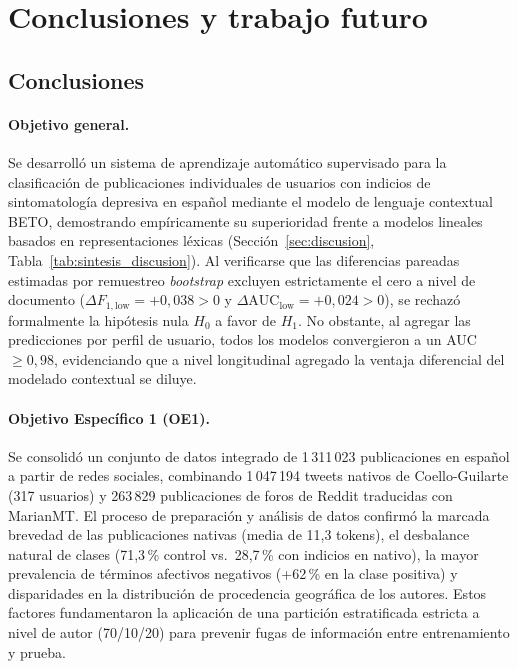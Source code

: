 \documentclass[12pt,a4paper]{article}
\begin{document}
\newpage
\section{Conclusiones y trabajo futuro}
\label{sec:conclusiones}

\subsection{Conclusiones}

\paragraph{Objetivo general.}
Se desarrolló un sistema de aprendizaje automático supervisado para la clasificación de publicaciones individuales de usuarios con indicios de sintomatología depresiva en español mediante el modelo de lenguaje contextual BETO, demostrando empíricamente su superioridad frente a modelos lineales basados en representaciones léxicas (Sección~\ref{sec:discusion}, Tabla~\ref{tab:sintesis_discusion}). Al verificarse que las diferencias pareadas estimadas por remuestreo \emph{bootstrap} excluyen estrictamente el cero a nivel de documento ($\Delta F_{1,\text{low}} = +0{,}038 > 0$ y $\Delta\text{AUC}_{\text{low}} = +0{,}024 > 0$), se rechazó formalmente la hipótesis nula $H_0$ a favor de $H_1$. No obstante, al agregar las predicciones por perfil de usuario, todos los modelos convergieron a un AUC $\ge 0{,}98$, evidenciando que a nivel longitudinal agregado la ventaja diferencial del modelado contextual se diluye.

\paragraph{Objetivo Específico 1 (OE1).}
Se consolidó un conjunto de datos integrado de 1\,311\,023 publicaciones en español a partir de redes sociales, combinando 1\,047\,194 tweets nativos de Coello-Guilarte (317 usuarios) y 263\,829 publicaciones de foros de Reddit traducidas con MarianMT. El proceso de preparación y análisis de datos confirmó la marcada brevedad de las publicaciones nativas (media de 11{,}3 tokens), el desbalance natural de clases (71{,}3\,\% control vs.\ 28{,}7\,\% con indicios en nativo), la mayor prevalencia de términos afectivos negativos (+62\,\% en la clase positiva) y disparidades en la distribución de procedencia geográfica de los autores. Estos factores fundamentaron la aplicación de una partición estratificada estricta a nivel de autor (70/10/20) para prevenir fugas de información entre entrenamiento y prueba.
\end{document}
